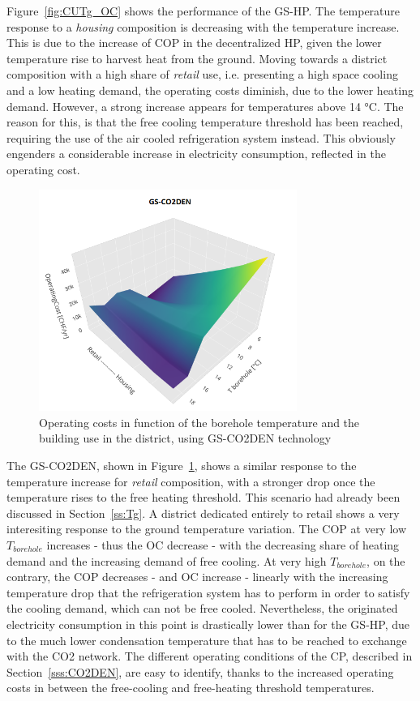 \documentclass{article}
\begin{document}
Figure~\ref{fig:CUTg_OC} shows the performance of the GS-HP. The temperature response to a \textit{housing} composition is decreasing with the temperature increase. This is due to the increase of COP in the decentralized HP, given the lower temperature rise to harvest heat from the ground. Moving towards a district composition with a high share of \textit{retail} use, i.e. presenting a high space cooling and a low heating demand, the operating costs diminish, due to the lower heating demand. However, a strong increase appears for temperatures above 14 \si{\celsius}. The reason for this, is that the free cooling temperature threshold has been reached, requiring the use of the air cooled refrigeration system instead. This obviously engenders a considerable increase in electricity consumption, reflected in the operating cost.

\begin{figure}[htp]
	\centering
	\includegraphics[width=0.75\textwidth]{CUTg_SA_CO2_OC.png}
	\caption{Operating costs in function of the borehole temperature and the building use in the district, using GS-CO2DEN technology}
	\label{fig:CUTg_CO2_OC}
\end{figure}

The GS-CO2DEN, shown in Figure~\ref{fig:CUTg_CO2_OC}, shows a similar response to the temperature increase for \textit{retail} composition, with a stronger drop once the temperature rises to the free heating threshold. This scenario had already been discussed in Section~\ref{ss:Tg}. A district dedicated entirely to retail shows a very interesiting response to the ground temperature variation. The COP at very low $T_{borehole}$ increases - thus the OC decrease - with the decreasing share of heating demand and the increasing demand of free cooling. At very high $T_{borehole}$, on the contrary, the COP decreases - and OC increase - linearly with the increasing temperature drop that the refrigeration system has to perform in order to satisfy the cooling demand, which can not be free cooled. Nevertheless, the originated electricity consumption in this point is drastically lower than for the GS-HP, due to the much lower condensation temperature that has to be reached to exchange with the CO2 network. The different operating conditions of the CP, described in Section~\ref{sss:CO2DEN}, are easy to identify, thanks to the increased operating costs in between the free-cooling and free-heating threshold temperatures.
\end{document}
